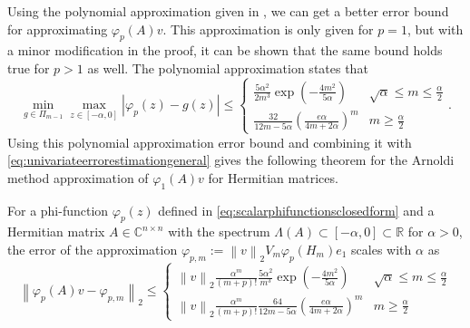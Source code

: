 Using the polynomial approximation given in \cite[Lemma A.1]{kressner2019krylov}, we can get a better error bound
for approximating $\varphi_p(A)v$. This approximation is only given for $p=1$, but with a minor modification in the
proof, it can be shown that the same bound holds true for $p > 1$ as well.
The polynomial approximation states that
\begin{equation}
    \min_{g \in \Pi_{m-1}} \max_{z \in [-\alpha, 0]} \left|\varphi_p(z) - g(z) \right| \le
    \begin{cases}
        \frac{5\alpha^2}{2m^3} \exp \left( -\frac{4m^2}{5\alpha} \right) & \sqrt{\alpha} \le m \le \frac{\alpha}{2}
        \\
        \frac{32}{12m-5\alpha} \left( \frac{e \alpha}{4m+2\alpha} \right)^m & m \ge \frac{\alpha}{2}
    \end{cases}.
\end{equation}
Using this polynomial approximation error bound and combining it with \autoref{eq:univariateerrorestimationgeneral}
gives the following theorem for the Arnoldi method approximation of $\varphi_1(A)v$ for Hermitian matrices.
\begin{mdframed}
    \begin{theorem}
        \label{th:univariateerrorestimationchebyshev}
        For a phi-function $\varphi_p(z)$ defined in \autoref{eq:scalarphifunctionsclosedform} and a Hermitian matrix
        $A \in \mathbb{C}^{n \times n}$ with the spectrum $\Lambda(A) \subset [-\alpha, 0] \subset \mathbb{R}$ for $\alpha > 0$,
        the error of the approximation $\varphi_{p, m} := \left\| v \right\|_{2} V_m \varphi_p(H_m) e_1$ scales with $\alpha$ as
        \begin{equation}
            \label{eq:univariateerrorestimationphi1}
            \left\| \varphi_p(A)v - \varphi_{p, m} \right\|_2 \le
            \begin{cases}
                \left\| v \right\|_2 \frac{\alpha^m}{(m+p)!} \frac{5\alpha^2}{m^3} \exp \left( -\frac{4m^2}{5\alpha} \right)
                & \sqrt{\alpha} \le m \le \frac{\alpha}{2}
                \\
                \left\| v \right\|_2 \frac{\alpha^m}{(m+p)!} \frac{64}{12m-5\alpha} \left( \frac{e \alpha}{4m+2\alpha} \right)^m
                & m \ge \frac{\alpha}{2}
            \end{cases}
        \end{equation}
    \end{theorem}
\end{mdframed}

